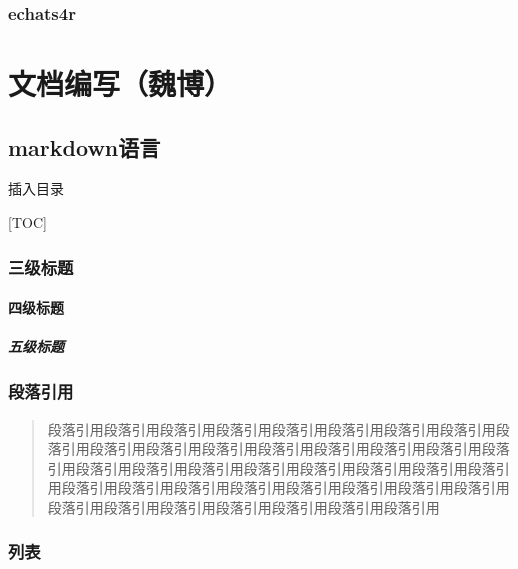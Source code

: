 \documentclass[]{book}
\let\oldparagraph\paragraph
\renewcommand{\paragraph}[1]{\oldparagraph{#1}\mbox{}}
\begin{document}
\hypertarget{echats4r}{%
\subsection{echats4r}\label{echats4r}}

\hypertarget{section-36}{%
\chapter{文档编写（魏博）}\label{section-36}}

\hypertarget{markdown}{%
\section{markdown语言}\label{markdown}}

插入目录

{[}TOC{]}

\hypertarget{section-37}{%
\subsection{三级标题}\label{section-37}}

\hypertarget{section-38}{%
\subsubsection{四级标题}\label{section-38}}

\hypertarget{section-39}{%
\paragraph{五级标题}\label{section-39}}

\hypertarget{section-40}{%
\subsection{段落引用}\label{section-40}}

\begin{quote}
段落引用段落引用段落引用段落引用段落引用段落引用段落引用段落引用段落引用段落引用段落引用段落引用段落引用段落引用段落引用段落引用段落引用段落引用段落引用段落引用段落引用段落引用段落引用段落引用段落引用段落引用段落引用段落引用段落引用段落引用段落引用段落引用段落引用段落引用段落引用段落引用段落引用段落引用段落引用段落引用
\end{quote}

\hypertarget{section-41}{%
\subsection{列表}\label{section-41}}
\end{document}
